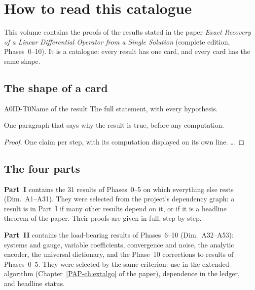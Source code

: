 \chapter*{How to read this catalogue}

This volume contains the proofs of the results stated in the paper \emph{Exact Recovery of a Linear Differential Operator from a Single Solution} (complete edition, Phases~0--10). It is a catalogue: every result has one card, and every card has the same shape.

\section*{The shape of a card}

\begin{dimcard}{A0}{ID-T0}{Name of the result}{\proved}{}
The full statement, with every hypothesis.
\end{dimcard}
\begin{proofidea}
One paragraph that says why the result is true, before any computation.
\end{proofidea}
\begin{proof}
One claim per step, with its computation displayed on its own line.
\dots
{}
\end{proof}

\section*{The four parts}

\textbf{Part~I} contains the 31 results of Phases~0--5 on which everything else rests (Dim.~A1--A31). They were selected from the project's dependency graph: a result is in Part~I if many other results depend on it, or if it is a headline theorem of the paper. Their proofs are given in full, step by step.

\textbf{Part~II} contains the load-bearing results of Phases~6--10 (Dim.~A32--A53): systems and gauge, variable coefficients, convergence and noise, the analytic encoder, the universal dictionary, and the Phase~10 corrections to results of Phases~0--5. They were selected by the same criterion: use in the extended algorithm (Chapter~\ref{PAP-ch:extalgo} of the paper), dependence in the ledger, and headline status.

